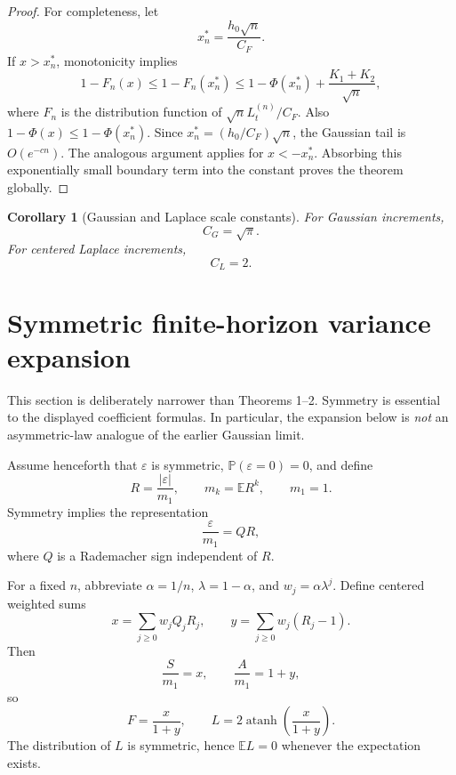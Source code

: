 \documentclass[11pt]{article}
\newtheorem{corollary}{Corollary}
\newcommand{\E}{\mathbb E}
\newcommand{\Prob}{\mathbb P}
\newcommand{\atanh}{\operatorname{atanh}}
\begin{document}
\begin{proof}
For completeness, let
\begin{equation}
 x_n^*=\frac{h_0\sqrt n}{C_F}.
\end{equation}
If $x>x_n^*$, monotonicity implies
\begin{equation}
1-F_n(x)\le 1-F_n(x_n^*)
\le 1-\Phi(x_n^*)+\frac{K_1+K_2}{\sqrt n},
\end{equation}
where $F_n$ is the distribution function of $\sqrt n L_t^{(n)}/C_F$.
Also $1-\Phi(x)\le1-\Phi(x_n^*)$. Since
$x_n^*=(h_0/C_F)\sqrt n$, the Gaussian tail is $O(e^{-cn})$.
The analogous argument applies for $x<-x_n^*$. Absorbing this exponentially
small boundary term into the constant proves the theorem globally.
\end{proof}

\begin{corollary}[Gaussian and Laplace scale constants]
For Gaussian increments,
\begin{equation}
\boxed{C_G=\sqrt\pi.}
\end{equation}
For centered Laplace increments,
\begin{equation}
\boxed{C_L=2.}
\end{equation}
\end{corollary}

\section{Symmetric finite-horizon variance expansion}
This section is deliberately narrower than Theorems 1--2. Symmetry is essential to the displayed coefficient formulas. In particular, the expansion below is \emph{not} an asymmetric-law analogue of the earlier Gaussian limit.

Assume henceforth that $\varepsilon$ is symmetric, $\Prob(\varepsilon=0)=0$, and define
\begin{equation}
R=\frac{|\varepsilon|}{m_1},\qquad m_k=\E R^k,
\qquad m_1=1.
\end{equation}
Symmetry implies the representation
\begin{equation}
\frac{\varepsilon}{m_1}=QR,
\end{equation}
where $Q$ is a Rademacher sign independent of $R$.

For a fixed $n$, abbreviate $\alpha=1/n$, $\lambda=1-\alpha$, and $w_j=\alpha\lambda^j$. Define centered weighted sums
\begin{equation}
x=\sum_{j\ge0}w_jQ_jR_j,
\qquad
y=\sum_{j\ge0}w_j(R_j-1).
\end{equation}
Then
\begin{equation}
\frac{S}{m_1}=x,\qquad \frac{A}{m_1}=1+y,
\end{equation}
so
\begin{equation}
F=\frac{x}{1+y},\qquad
L=2\atanh\!\left(\frac{x}{1+y}\right).
\end{equation}
The distribution of $L$ is symmetric, hence $\E L=0$ whenever the expectation exists.
\end{document}
